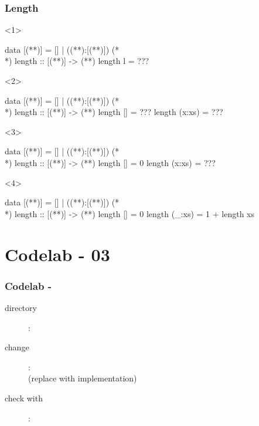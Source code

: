 \documentclass[17pt]{beamer}
\renewcommand{\(}[1]{\begin{columns}[#1]}
\renewcommand{\)}{\end{columns}}
\newcommand{\<}[1]{\begin{column}{#1}}
\renewcommand{\>}{\end{column}}
\begin{document}
\begin{frame}[fragile]
  \frametitle{Length}
  \begin{minipage}[t][.4\textheight]{\textwidth}
    \begin{onlyenv}<1>
      \begin{code}
data [(**)] = [] | ((**):[(**)])
(*\\*)
length :: [(**)] -> (**)
length l = ???
      \end{code}
    \end{onlyenv}
    \begin{onlyenv}<2>
      \begin{code}
data [(**)] = [] | ((**):[(**)])
(*\\*)
length :: [(**)] -> (**)
length []     = ???
length (x:xs) = ???
      \end{code}
    \end{onlyenv}
    \begin{onlyenv}<3>
      \begin{code}
data [(**)] = [] | ((**):[(**)])
(*\\*)
length :: [(**)] -> (**)
length []     = 0
length (x:xs) = ???
      \end{code}
    \end{onlyenv}
    \begin{onlyenv}<4>
      \begin{code}
data [(**)] = [] | ((**):[(**)])
(*\\*)
length :: [(**)] -> (**)
length []     = 0
length (_:xs) = 1 + length xs
      \end{code}
    \end{onlyenv}
  \end{minipage}
  \begin{minipage}[c][.3\textheight]{\textwidth}
    \begin{center}
    \end{center}
  \end{minipage}
\end{frame}


\section{Codelab - 03}

\begin{frame}
  \frametitle{Codelab - }
  \begin{description}
    \item[directory]: 
    \item[change]:  \\
      (replace  with implementation)
    \item[check with]: 
  \end{description}
\end{frame}
\end{document}
